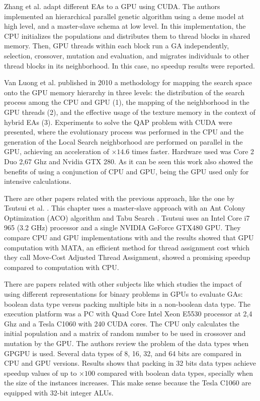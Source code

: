\documentclass[review]{elsarticle}
\begin{document}
Zhang et al. \cite{ZhangImplementationMasterSlave} adapt different EAs to a GPU using CUDA. The authors implemented an hierarchical parallel genetic algorithm using a deme model at high level, and a master-slave schema at low level. In this implementation, the CPU initializes the populations and distributes them to thread blocks in shared memory. Then, GPU threads within each block run a GA independently, selection, crossover, mutation and evaluation, and migrates individuals to other thread blocks in its neighborhood. In this case, no speedup results were reported.

Van Luong et al. \cite{5586403} published in 2010 a methodology for mapping the search space onto the GPU memory hierarchy in three levels: the distribution of the search process among the CPU and GPU (1), the mapping of the neighborhood in the GPU threads (2), and the effective usage of the texture memory in the context of hybrid EAs (3). Experiments to solve the QAP problem with CUDA were presented, where the evolutionary process was performed in the CPU and the generation of the Local Search neighborhood are performed on parallel in the GPU, achieving an acceleration of $\times14.6$ times faster. Hardware used was Core 2 Duo 2,67 Ghz and Nvidia GTX 280. As it can be seen this work also showed the benefits of using a conjunction of CPU and GPU, being the GPU used only for intensive calculations.

There are other papers related with the previous approach, like the one by Tsutsui et al. \cite{Tsutsui:2011:GECCO}. This chapter uses a master-slave approach with an Ant Colony Optimization (ACO) algorithm \cite{Dorigo:1999:ACO:329055.329062} and Tabu Search \cite{Glover:1997:TS:549765}. Tsutsui uses an Intel Core i7 965 (3.2 GHz) processor and a single NVIDIA GeForce GTX480 GPU. They compare CPU and GPU implementations with and the results showed that GPU computation with MATA, an efficient method for thread assignment cost which they call Move-Cost Adjusted Thread Assignment, showed a promising speedup compared to computation with CPU.

There are papers related with other subjects %
like \cite{Pedemonte:2011:BOG:2001858.2002031} which studies the impact of using different representations for binary problems in GPUs to evaluate GAs: boolean data type versus packing multiple bits in a non-boolean data type. The execution platform was a PC with Quad Core Intel Xeon E5530 processor at 2,4 Ghz and a Tesla C1060 with 240 CUDA cores. The CPU only calculates the initial population and a matrix of random number to be used in crossover and mutation by the GPU. The authors review the problem of the data types when GPGPU is used. Several data types of 8, 16, 32, and 64 bits are compared in CPU and GPU versions. Results shows that
packing in 32 bits data types achieve speedup values of up to
$\times100$ compared with boolean data types, specially when the size
of the instances increases. This make sense because the Tesla C1060
are equipped with 32-bit integer ALUs.  
\end{document}
